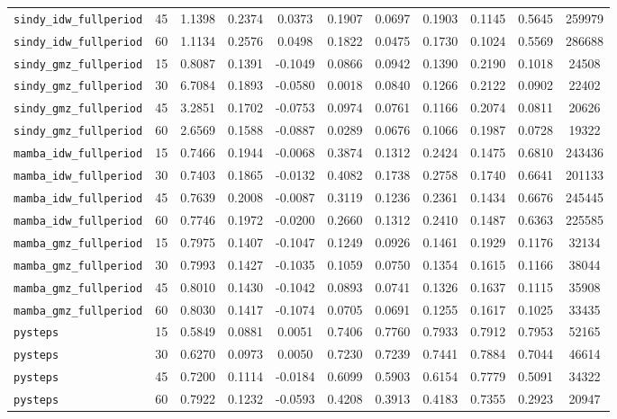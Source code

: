 \documentclass[12pt, a4paper]{article}
\begin{document}
{\begin{longtable}{p{4.0cm}cccccccccc}
\texttt{sindy\_idw\_fullperiod} & 45 & 1.1398 & 0.2374 & 0.0373 & 0.1907 & 0.0697 & 0.1903 & 0.1145 & 0.5645 & 259979 \\
\texttt{sindy\_idw\_fullperiod} & 60 & 1.1134 & 0.2576 & 0.0498 & 0.1822 & 0.0475 & 0.1730 & 0.1024 & 0.5569 & 286688 \\
\addlinespace[1pt]
\texttt{sindy\_gmz\_fullperiod} & 15 & 0.8087 & 0.1391 & -0.1049 & 0.0866 & 0.0942 & 0.1390 & 0.2190 & 0.1018 & 24508 \\
\texttt{sindy\_gmz\_fullperiod} & 30 & 6.7084 & 0.1893 & -0.0580 & 0.0018 & 0.0840 & 0.1266 & 0.2122 & 0.0902 & 22402 \\
\texttt{sindy\_gmz\_fullperiod} & 45 & 3.2851 & 0.1702 & -0.0753 & 0.0974 & 0.0761 & 0.1166 & 0.2074 & 0.0811 & 20626 \\
\texttt{sindy\_gmz\_fullperiod} & 60 & 2.6569 & 0.1588 & -0.0887 & 0.0289 & 0.0676 & 0.1066 & 0.1987 & 0.0728 & 19322 \\
\addlinespace[1pt]
\texttt{mamba\_idw\_fullperiod} & 15 & 0.7466 & 0.1944 & -0.0068 & 0.3874 & 0.1312 & 0.2424 & 0.1475 & 0.6810 & 243436 \\
\texttt{mamba\_idw\_fullperiod} & 30 & 0.7403 & 0.1865 & -0.0132 & 0.4082 & 0.1738 & 0.2758 & 0.1740 & 0.6641 & 201133 \\
\texttt{mamba\_idw\_fullperiod} & 45 & 0.7639 & 0.2008 & -0.0087 & 0.3119 & 0.1236 & 0.2361 & 0.1434 & 0.6676 & 245445 \\
\texttt{mamba\_idw\_fullperiod} & 60 & 0.7746 & 0.1972 & -0.0200 & 0.2660 & 0.1312 & 0.2410 & 0.1487 & 0.6363 & 225585 \\
\addlinespace[1pt]
\texttt{mamba\_gmz\_fullperiod} & 15 & 0.7975 & 0.1407 & -0.1047 & 0.1249 & 0.0926 & 0.1461 & 0.1929 & 0.1176 & 32134 \\
\texttt{mamba\_gmz\_fullperiod} & 30 & 0.7993 & 0.1427 & -0.1035 & 0.1059 & 0.0750 & 0.1354 & 0.1615 & 0.1166 & 38044 \\
\texttt{mamba\_gmz\_fullperiod} & 45 & 0.8010 & 0.1430 & -0.1042 & 0.0893 & 0.0741 & 0.1326 & 0.1637 & 0.1115 & 35908 \\
\texttt{mamba\_gmz\_fullperiod} & 60 & 0.8030 & 0.1417 & -0.1074 & 0.0705 & 0.0691 & 0.1255 & 0.1617 & 0.1025 & 33435 \\
\addlinespace[1pt]
\texttt{pysteps} & 15 & 0.5849 & 0.0881 & 0.0051 & 0.7406 & 0.7760 & 0.7933 & 0.7912 & 0.7953 & 52165 \\
\texttt{pysteps} & 30 & 0.6270 & 0.0973 & 0.0050 & 0.7230 & 0.7239 & 0.7441 & 0.7884 & 0.7044 & 46614 \\
\texttt{pysteps} & 45 & 0.7200 & 0.1114 & -0.0184 & 0.6099 & 0.5903 & 0.6154 & 0.7779 & 0.5091 & 34322 \\
\texttt{pysteps} & 60 & 0.7922 & 0.1232 & -0.0593 & 0.4208 & 0.3913 & 0.4183 & 0.7355 & 0.2923 & 20947 \\
\end{longtable}
}
\end{document}
